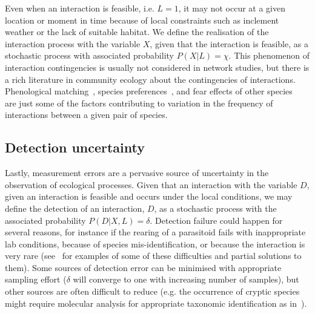 \documentclass[12pt]{article}
\begin{document}
\begin{spacing}{2.0}
    Even when an interaction is feasible, i.e. $L=1$, it may not occur at a given location or moment in time because of local constraints such as inclement weather or the lack of suitable habitat. We define the realisation of the interaction process with the variable $X$, given that the interaction is feasible, as a stochastic process with associated probability $P(X|L)=\chi$. This phenomenon of interaction contingencies is usually not considered in network studies, but there is a rich literature in community ecology about the contingencies of interactions. Phenological matching~\citep{MillerRushing2010,Gezon2016}, species preferences~\citep{Pires2011,Novak2015,Coux2016}, and fear effects of other species~\citep{Luttbeg2005,Wirsing2008} are just some of the factors contributing to variation in the frequency of interactions between a given pair of species.

    \subsection*{Detection uncertainty} 

    Lastly, measurement errors are a pervasive source of uncertainty in the observation of ecological processes. Given that an interaction with the variable $D$, given an interaction is feasible and occurs under the local conditions, we may define the detection of an interaction, $D$, as a stochastic process with the associated probability $P(D|X,L)=\delta$. Detection failure could happen for several reasons, for instance if the rearing of a parasitoid fails with inappropriate lab conditions, because of species mis-identification, or because the interaction is very rare (see~\citet{Wirta2014} for examples of some of these difficulties and partial solutions to them). Some sources of detection error can be minimised with appropriate sampling effort ($\delta$ will converge to one with increasing number of samples), but other sources are often difficult to reduce (e.g. the occurrence of cryptic species might require molecular analysis for appropriate taxonomic identification as in~\citealt{Wirta2014,Frost2016}).



\end{spacing}
\end{document}
